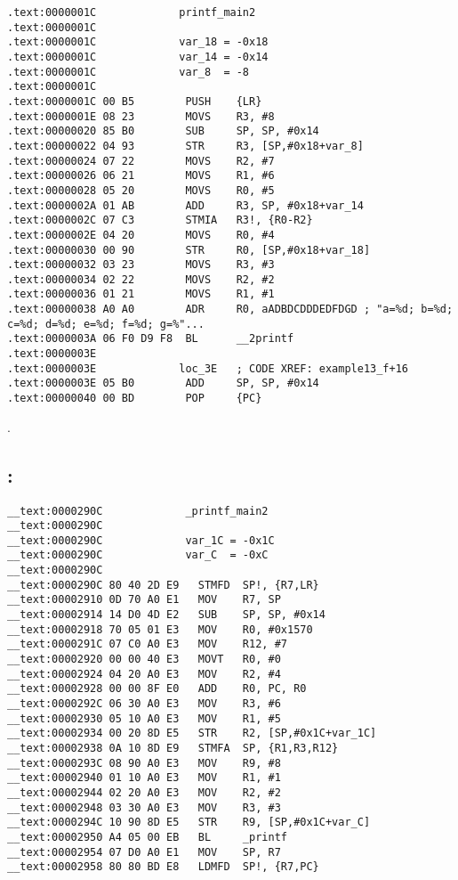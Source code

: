 \begin{lstlisting}
.text:0000001C             printf_main2
.text:0000001C
.text:0000001C             var_18 = -0x18
.text:0000001C             var_14 = -0x14
.text:0000001C             var_8  = -8
.text:0000001C
.text:0000001C 00 B5        PUSH    {LR}
.text:0000001E 08 23        MOVS    R3, #8
.text:00000020 85 B0        SUB     SP, SP, #0x14
.text:00000022 04 93        STR     R3, [SP,#0x18+var_8]
.text:00000024 07 22        MOVS    R2, #7
.text:00000026 06 21        MOVS    R1, #6
.text:00000028 05 20        MOVS    R0, #5
.text:0000002A 01 AB        ADD     R3, SP, #0x18+var_14
.text:0000002C 07 C3        STMIA   R3!, {R0-R2}
.text:0000002E 04 20        MOVS    R0, #4
.text:00000030 00 90        STR     R0, [SP,#0x18+var_18]
.text:00000032 03 23        MOVS    R3, #3
.text:00000034 02 22        MOVS    R2, #2
.text:00000036 01 21        MOVS    R1, #1
.text:00000038 A0 A0        ADR     R0, aADBDCDDDEDFDGD ; "a=%d; b=%d; c=%d; d=%d; e=%d; f=%d; g=%"...
.text:0000003A 06 F0 D9 F8  BL      __2printf
.text:0000003E
.text:0000003E             loc_3E   ; CODE XREF: example13_f+16
.text:0000003E 05 B0        ADD     SP, SP, #0x14
.text:00000040 00 BD        POP     {PC}
\end{lstlisting}

.

\subsection{\OptimizingXcodeIV: \ARMMode}

\begin{lstlisting}
__text:0000290C             _printf_main2
__text:0000290C
__text:0000290C             var_1C = -0x1C
__text:0000290C             var_C  = -0xC
__text:0000290C
__text:0000290C 80 40 2D E9   STMFD  SP!, {R7,LR}
__text:00002910 0D 70 A0 E1   MOV    R7, SP
__text:00002914 14 D0 4D E2   SUB    SP, SP, #0x14
__text:00002918 70 05 01 E3   MOV    R0, #0x1570
__text:0000291C 07 C0 A0 E3   MOV    R12, #7
__text:00002920 00 00 40 E3   MOVT   R0, #0
__text:00002924 04 20 A0 E3   MOV    R2, #4
__text:00002928 00 00 8F E0   ADD    R0, PC, R0
__text:0000292C 06 30 A0 E3   MOV    R3, #6
__text:00002930 05 10 A0 E3   MOV    R1, #5
__text:00002934 00 20 8D E5   STR    R2, [SP,#0x1C+var_1C]
__text:00002938 0A 10 8D E9   STMFA  SP, {R1,R3,R12}
__text:0000293C 08 90 A0 E3   MOV    R9, #8
__text:00002940 01 10 A0 E3   MOV    R1, #1
__text:00002944 02 20 A0 E3   MOV    R2, #2
__text:00002948 03 30 A0 E3   MOV    R3, #3
__text:0000294C 10 90 8D E5   STR    R9, [SP,#0x1C+var_C]
__text:00002950 A4 05 00 EB   BL     _printf
__text:00002954 07 D0 A0 E1   MOV    SP, R7
__text:00002958 80 80 BD E8   LDMFD  SP!, {R7,PC}
\end{lstlisting}

